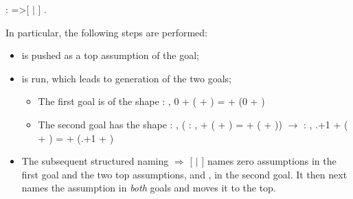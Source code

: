 \begin{coqdoccode}
\coqdocemptyline
\coqdocnoindent
{}: =>[ \ensuremath{|}   ] .\coqdoceol
\coqdocemptyline
\end{coqdoccode}


In particular, the following steps are performed:



\begin{itemize}
\item  {} is pushed as a top assumption of the goal;

\item  {} is run, which leads to generation of the two goals;



\begin{itemize}
\item  The first goal is of the shape
\coqdoceol
\coqdocemptyline
\coqdocnoindent
\coqdockw{\ensuremath{\forall}}  : , 0 + ( + ) =  + (0 + )

\coqdocemptyline



\item  The second goal has the shape
\coqdoceol
\coqdocemptyline
\coqdocnoindent
\coqdockw{\ensuremath{\forall}}  : ,\coqdoceol
\coqdocindent{0.50em}
(\coqdockw{\ensuremath{\forall}}  : ,  + ( + ) =  + ( + )) \ensuremath{\rightarrow}\coqdoceol
\coqdocindent{0.50em}
\coqdockw{\ensuremath{\forall}}  : , .+1 + ( + ) =  + (.+1 + )

\coqdocemptyline



\end{itemize}

\item  The subsequent structured naming \ensuremath{\Rightarrow} [ \ensuremath{|}  ]  names zero
  assumptions in the first goal and the two top assumptions,  and
  , in the second goal. It then next names the assumption  in
  \textit{both} goals and moves it to the top.

\end{itemize}


